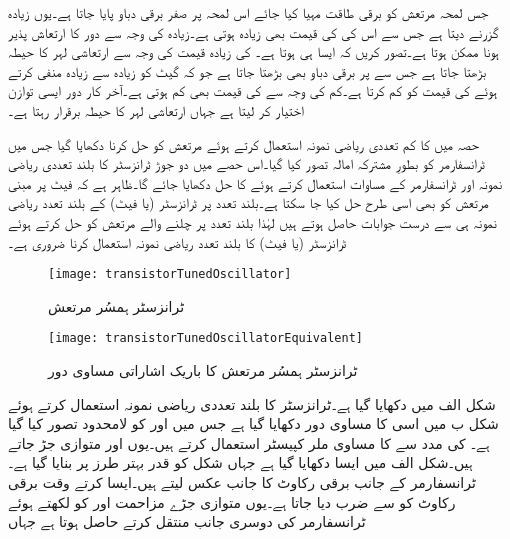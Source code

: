 جس لمحہ مرتعش کو برقی طاقت  مہیا کیا جائے اس لمحہ  پر صفر برقی دباو پایا جاتا ہے۔یوں   زیادہ  گزرنے دیتا ہے جس سے اس کی  کی قیمت بھی زیادہ ہوتی ہے۔زیادہ  کی وجہ سے دور کا ارتعاش پذیر ہونا ممکن ہوتا ہے۔تصور  کریں کہ ایسا ہی ہوتا ہے۔ کی زیادہ قیمت کی وجہ سے ارتعاشی لہر کا حیطہ بڑھتا جاتا ہے جس سے  پر برقی دباو  بھی بڑھتا جاتا ہے جو کہ گیٹ کو زیادہ سے زیادہ منفی کرتے ہوئے  کی قیمت کو کم کرتا ہے۔کم  کی وجہ سے  کی قیمت بھی کم ہوتی ہے۔آخر کار دور ایسی توازن اختیار  کر لیتا ہے جہاں ارتعاشی لہر کا حیطہ برقرار رہتا ہے۔ 

حصہ  میں  کا کم تعددی ریاضی نمونہ استعمال کرتے  ہوئے مرتعش کو حل کرنا دکھایا گیا جس میں ٹرانسفارمر کو بطورِ مشترکہ امالہ تصور کیا گیا۔اس حصے میں دو جوڑ ٹرانزسٹر کا بلند تعددی ریاضی نمونہ اور ٹرانسفارمر کے مساوات استعمال کرتے ہوئے  کا حل دکھایا جائے گا۔ظاہر ہے  کہ فیٹ پر مبنی مرتعش کو بھی اسی طرح حل کیا جا سکتا ہے۔بلند تعدد پر ٹرانزسٹر (یا فیٹ) کے بلند تعدد ریاضی نمونہ ہی سے درست جوابات حاصل ہوتے ہیں لہٰذا بلند تعدد پر چلنے والے مرتعش کو حل کرتے ہوئے ٹرانزسٹر (یا فیٹ) کا بلند تعدد ریاضی نمونہ استعمال کرنا ضروری ہے۔
\begin{figure}
\centering
\texttt{[image: transistorTunedOscillator]}
\caption{ٹرانزسٹر ہمسُر مرتعش}
\label{شکل_ٹرانزسٹر_ہمسر_مرتعش}
\end{figure}
%
\begin{figure}
\centering
\texttt{[image: transistorTunedOscillatorEquivalent]}
\caption{ٹرانزسٹر ہمسُر مرتعش کا باریک اشاراتی مساوی دور}
\label{شکل_ٹرانزسٹر_ہمسر_مرتعش_مساوی}
\end{figure}
%
شکل  الف میں  دکھایا گیا ہے۔ٹرانزسٹر کا بلند تعددی ریاضی نمونہ استعمال کرتے ہوئے شکل  ب میں اسی کا مساوی دور دکھایا گیا ہے جس میں  اور  کو لامحدود تصور کیا گیا ہے۔ کی مدد سے  کا مساوی ملر کپیسٹر استعمال کرتے ہیں۔یوں  اور  متوازی جڑ جاتے ہیں۔شکل  الف میں ایسا دکھایا گیا ہے جہاں شکل کو قدر بہتر طرز پر بنایا گیا ہے۔ٹرانسفارمر کے  جانب برقی رکاوٹ کا  جانب عکس لیتے ہیں۔ایسا کرتے وقت برقی رکاوٹ کو  سے ضرب دیا جاتا ہے۔یوں متوازی جڑے مزاحمت  اور  کو  لکھتے ہوئے ٹرانسفارمر کی دوسری جانب منتقل کرتے  حاصل ہوتا ہے جہاں

